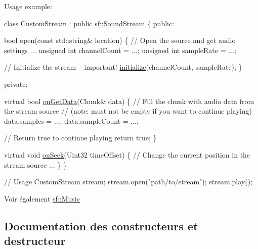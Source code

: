Usage example\+: 
\begin{DoxyCode}
\textcolor{keyword}{class }CustomStream : \textcolor{keyword}{public} \hyperlink{classsf_1_1SoundStream}{sf::SoundStream}
\{
\textcolor{keyword}{public}:

    \textcolor{keywordtype}{bool} open(\textcolor{keyword}{const} std::string& location)
    \{
        \textcolor{comment}{// Open the source and get audio settings}
        ...
        \textcolor{keywordtype}{unsigned} \textcolor{keywordtype}{int} channelCount = ...;
        \textcolor{keywordtype}{unsigned} \textcolor{keywordtype}{int} sampleRate = ...;

        \textcolor{comment}{// Initialize the stream -- important!}
        \hyperlink{classsf_1_1SoundStream_a9c351711198ee1aa77c2fefd3ced4d2c}{initialize}(channelCount, sampleRate);
    \}

\textcolor{keyword}{private}:

    \textcolor{keyword}{virtual} \textcolor{keywordtype}{bool} \hyperlink{classsf_1_1SoundStream_a968ec024a6e45490962c8a1121cb7c5f}{onGetData}(Chunk& data)
    \{
        \textcolor{comment}{// Fill the chunk with audio data from the stream source}
        \textcolor{comment}{// (note: must not be empty if you want to continue playing)}
        data.samples = ...;
        data.sampleCount = ...;

        \textcolor{comment}{// Return true to continue playing}
        \textcolor{keywordflow}{return} \textcolor{keyword}{true};
    \}

    \textcolor{keyword}{virtual} \textcolor{keywordtype}{void} \hyperlink{classsf_1_1SoundStream_a907036dd2ca7d3af5ead316e54b75997}{onSeek}(Uint32 timeOffset)
    \{
        \textcolor{comment}{// Change the current position in the stream source}
        ...
    \}
\}

\textcolor{comment}{// Usage}
CustomStream stream;
stream.open(\textcolor{stringliteral}{"path/to/stream"});
stream.play();
\end{DoxyCode}


\begin{DoxySeeAlso}{Voir également}
\hyperlink{classsf_1_1Music}{sf\+::\+Music} 
\end{DoxySeeAlso}


\subsection{Documentation des constructeurs et destructeur}
\mbox{\label{classsf_1_1SoundStream_a769d08f4c3c6b4340ef3a838329d2e5c}} 
